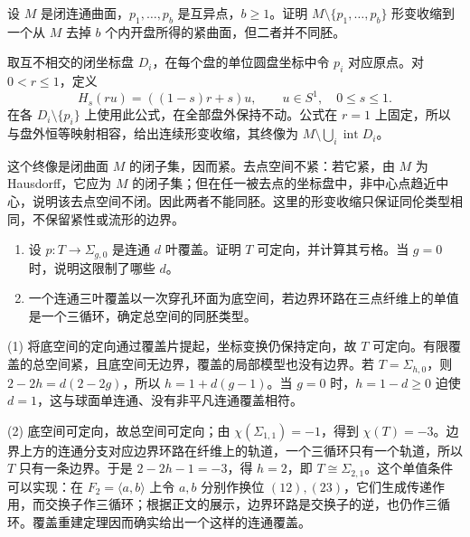 \begin{exercise}
	设 \(M\) 是闭连通曲面，\(p_1,\ldots,p_b\) 是互异点，\(b\ge1\)。证明 \(M\setminus\{p_1,\ldots,p_b\}\) 形变收缩到一个从 \(M\) 去掉 \(b\) 个内开盘所得的紧曲面，但二者并不同胚。
\end{exercise}
\begin{solution}
	取互不相交的闭坐标盘 \(D_i\)，在每个盘的单位圆盘坐标中令 \(p_i\) 对应原点。对 \(0<r\le1\)，定义
	\[
		H_s(ru)=((1-s)r+s)u,\qquad u\in S^1,\quad 0\le s\le1.
	\]
	在各 \(D_i\setminus\{p_i\}\) 上使用此公式，在全部盘外保持不动。公式在 \(r=1\) 上固定，所以与盘外恒等映射相容，给出连续形变收缩，其终像为 \(M\setminus\bigcup_i\operatorname{int}D_i\)。

	这个终像是闭曲面 \(M\) 的闭子集，因而紧。去点空间不紧：若它紧，由 \(M\) 为 Hausdorff，它应为 \(M\) 的闭子集；但在任一被去点的坐标盘中，非中心点趋近中心，说明该去点空间不闭。因此两者不能同胚。这里的形变收缩只保证同伦类型相同，不保留紧性或流形的边界。
\end{solution}

\begin{exercise}\label{g1:ex:surface-cover-genus}
	\begin{enumerate}
		\item 设 \(p:T\rightarrow\Sigma_{g,0}\) 是连通 \(d\) 叶覆盖。证明 \(T\) 可定向，并计算其亏格。当 \(g=0\) 时，说明这限制了哪些 \(d\)。
		\item 一个连通三叶覆盖以一次穿孔环面为底空间，若边界环路在三点纤维上的单值是一个三循环，确定总空间的同胚类型。
	\end{enumerate}
\end{exercise}
\begin{solution}
	(1) 将底空间的定向通过覆盖片提起，坐标变换仍保持定向，故 \(T\) 可定向。有限覆盖的总空间紧，且底空间无边界，覆盖的局部模型也没有边界。若 \(T=\Sigma_{h,0}\)，则 \(2-2h=d(2-2g)\)，所以 \(h=1+d(g-1)\)。当 \(g=0\) 时，\(h=1-d\ge0\) 迫使 \(d=1\)，这与球面单连通、没有非平凡连通覆盖相符。

	(2) 底空间可定向，故总空间可定向；由 \(\chi(\Sigma_{1,1})=-1\)，得到 \(\chi(T)=-3\)。边界上方的连通分支对应边界环路在纤维上的轨道，一个三循环只有一个轨道，所以 \(T\) 只有一条边界。于是 \(2-2h-1=-3\)，得 \(h=2\)，即 \(T\cong\Sigma_{2,1}\)。这个单值条件可以实现：在 \(F_2=\langle a,b\rangle\) 上令 \(a,b\) 分别作换位 \((12),(23)\)，它们生成传递作用，而交换子作三循环；根据正文的展示，边界环路是交换子的逆，也仍作三循环。覆盖重建定理因而确实给出一个这样的连通覆盖。
\end{solution}

